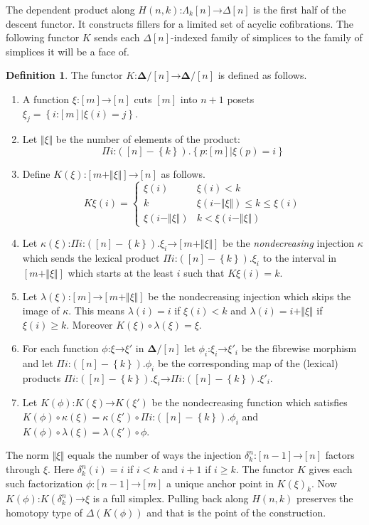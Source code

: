 \documentclass{amsart}
\theoremstyle{plain}
\theoremstyle{definition}
\newtheorem{defin}[theorem]{Definition}
\newcommand\set[1]{\left\{#1\right\}}
\newcommand\simCat{\mathbf\Delta}
\newcommand\of{\mathord:}
\renewcommand\to{\mathord\rightarrow}
\newcommand\simplex\Delta
\newcommand\horn\Lambda
\begin{document}
\newcommand\norm[1]{\Vert #1 \Vert}
\newcommand\ka\kappa
\newcommand\la\lambda
The dependent product along $H(n,k)\of \horn_k[n]\to\simplex[n]$ is the first half of the descent functor. It constructs fillers for a limited set of acyclic cofibrations. The following functor $K$ sends each $\simplex[n]$-indexed family of simplices to the family of simplices it will be a face of.

\begin{defin}
The functor $K\of\simCat/[n]\to\simCat/[n]$ is defined as follows. 
\begin{enumerate}
\item A function $\xi\of[m]\to[n]$ cuts $[m]$ into $n+1$ posets $\xi_j = \set{i\of[m]|\xi(i)=j}$. 
\item Let $\norm \xi$ be the number of elements of the product: \[\Pi i\of ([n]-\set k).\set{p\of [m]|\xi(p)=i}\] 
\item Define $K(\xi)\of [m+\norm\xi]\to [n]$ as follows.
\[ 
	K\xi(i) = \left\{
		\begin{array}{cc}
			\xi(i) & \xi(i)<k \\
			k & \xi(i-\norm\xi)\leq k \leq \xi(i)\\
			\xi(i-\norm\xi) & k<\xi(i-\norm\xi)
		\end{array}
	\right.
\]
\item Let $\ka(\xi)\of\Pi i\of([n]-\set k).\xi_i \to [m+\norm\xi]$ be the \emph{nondecreasing} injection $\ka$ which sends the lexical product $\Pi i\of([n]-\set k).\xi_i$ to the interval in $[m+\norm\xi]$ which starts at the least $i$ such that $K\xi(i)=k$.
\item Let $\la(\xi)\of[m]\to[m+\norm\xi]$ be the nondecreasing injection which skips the image of $\ka$. This means $\la(i)=i$ if $\xi(i)<k$ and $\la(i)=i+\norm\xi$ if $\xi(i)\geq k$. Moreover $K(\xi)\circ\la(\xi) = \xi$.
\item For each function $\phi\of\xi\to\xi'$ in $\simCat/[n]$ let $\phi_i\of\xi_i\to\xi'_i$ be the fibrewise morphism and let $\Pi i\of([n]-\set k).\phi_i$ be the corresponding map of the (lexical) products $\Pi i\of([n]-\set k).\xi_i\to\Pi i\of([n]-\set k).\xi'_i$.
\item Let $K(\phi)\of K(\xi)\to K(\xi')$ be the nondecreasing function which satisfies $K(\phi)\circ \ka(\xi) = \ka(\xi')\circ \Pi i\of([n]-\set k).\phi_i$ and $K(\phi)\circ \la(\xi) = \la(\xi')\circ \phi$.
\end{enumerate}
\end{defin}

The norm $\norm\xi$ equals the number of ways the injection $\delta^n_k\of[n-1]\to[n]$ factors through $\xi$. Here $\delta^n_k(i)=i$ if $i<k$ and $i+1$ if $i\geq k$. The functor $K$ gives each such factorization $\phi\of[n-1]\to [m]$ a unique anchor point in $K(\xi)_k$. Now $K(\phi)\of K(\delta^n_k)\to \xi$ is a full simplex. Pulling back along $H(n,k)$ preserves the homotopy type of $\Delta(K(\phi))$ and that is the point of the construction.
\end{document}
